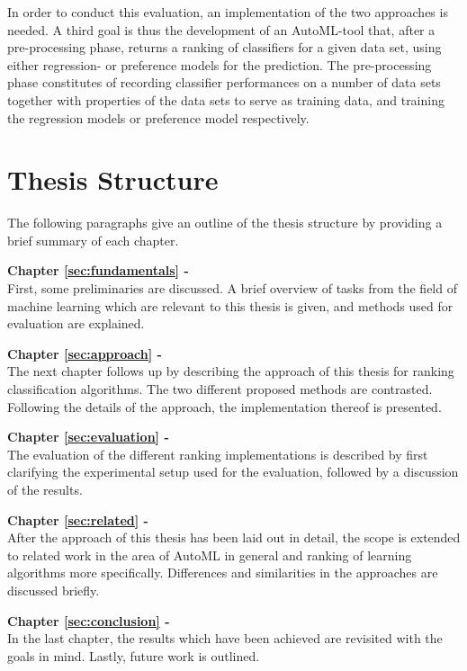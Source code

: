 In order to conduct this evaluation, an implementation of the two approaches is needed. A third goal is thus the development of an AutoML-tool that, after a pre-processing phase, returns a ranking of classifiers for a given data set, using either regression- or preference models for the prediction. The pre-processing phase constitutes of recording classifier performances on a number of data sets together with properties of the data sets to serve as training data, and training the regression models or preference model respectively.

\section{Thesis Structure}
\label{sec:intro:structure}
The following paragraphs give an outline of the thesis structure by providing a brief summary of each chapter.

\textbf{Chapter \ref{sec:fundamentals} - } \\[0.2em]
First, some preliminaries are discussed. A brief overview of tasks from the field of machine learning which are relevant to this thesis is given, and methods used for evaluation are explained. 

\textbf{Chapter \ref{sec:approach} - } \\[0.2em]
The next chapter follows up by describing the approach of this thesis for ranking classification algorithms. The two different proposed methods are contrasted. Following the details of the approach, the implementation thereof is presented.

\textbf{Chapter \ref{sec:evaluation} - } \\[0.2em]
The evaluation of the different ranking implementations is described by first clarifying the experimental setup used for the evaluation, followed by a discussion of the results.

\textbf{Chapter \ref{sec:related} - } \\[0.2em]
After the approach of this thesis has been laid out in detail, the scope is extended to related work in the area of AutoML in general and ranking of learning algorithms more specifically. Differences and similarities in the approaches are discussed briefly.

\textbf{Chapter \ref{sec:conclusion} - } \\[0.2em]
In the last chapter, the results which have been achieved are revisited with the goals in mind. Lastly, future work is outlined.

